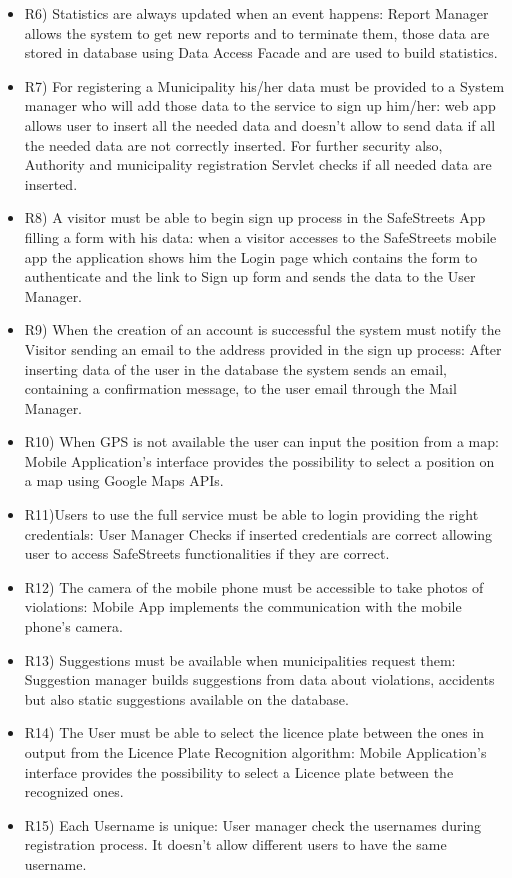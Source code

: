 \begin{itemize}
\item  R6) Statistics are always updated when an event happens: Report Manager allows the system to
get new reports and to terminate them, those data are stored in database using Data Access
Facade and are used to build statistics.

\item  R7) For registering a Municipality his/her data must be provided to a System manager who will
add those data to the service to sign up him/her: web app allows user to insert all the needed data
and doesn’t allow to send data if all the needed data are not correctly inserted. For further security
also, Authority and municipality registration Servlet checks if all needed data are inserted.

\item  R8) A visitor must be able to begin sign up process in the SafeStreets App filling a form with his
data: when a visitor accesses to the SafeStreets mobile app the application shows him the Login
page which contains the form to authenticate and the link to Sign up form and sends the data to the
User Manager.

\item  R9) When the creation of an account is successful the system must notify the Visitor sending an
email to the address provided in the sign up process: After inserting data of the user in the database
the system sends an email, containing a confirmation message, to the user email through the Mail
Manager.

\item  R10) When GPS is not available the user can input the position from a map: Mobile Application’s
interface provides the possibility to select a position on a map using Google Maps APIs.

\item  R11)Users to use the full service must be able to login providing the right credentials: User Manager
Checks if inserted credentials are correct allowing user to access SafeStreets functionalities if
they are correct.

\item  R12) The camera of the mobile phone must be accessible to take photos of violations: Mobile App
implements the communication with the mobile phone’s camera.

\item  R13) Suggestions must be available when municipalities request them: Suggestion manager
builds suggestions from data about violations, accidents but also static suggestions available on
the database.

\item  R14) The User must be able to select the licence plate between the ones in output from the Licence
Plate Recognition algorithm: Mobile Application’s interface provides the possibility to select a
Licence plate between the recognized ones.

\item  R15) Each Username is unique: User manager check the usernames during registration process.
It doesn’t allow different users to have the same username.
\end{itemize}
\clearpage
